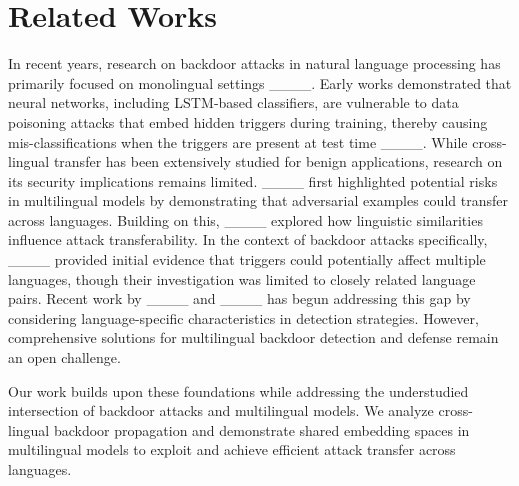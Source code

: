 \section{Related Works}
\label{sec:related}
In recent years, research on backdoor attacks in natural language processing has primarily focused on monolingual settings ____. Early works demonstrated that neural networks, including LSTM‐based classifiers, are vulnerable to data poisoning attacks that embed hidden triggers during training, thereby causing mis-classifications when the triggers are present at test time ____.
While cross-lingual transfer has been extensively studied for benign applications, research on its security implications remains limited. ____ first highlighted potential risks in multilingual models by demonstrating that adversarial examples could transfer across languages. Building on this, ____ explored how linguistic similarities influence attack transferability. In the context of backdoor attacks specifically, ____ provided initial evidence that triggers could potentially affect multiple languages, though their investigation was limited to closely related language pairs. Recent work by ____ and ____ has begun addressing this gap by considering language-specific characteristics in detection strategies. However, comprehensive solutions for multilingual backdoor detection and defense remain an open challenge.

Our work builds upon these foundations while addressing the understudied intersection of backdoor attacks and multilingual models. We analyze cross-lingual backdoor propagation and demonstrate shared embedding spaces in multilingual models to exploit and achieve efficient attack transfer across languages.
